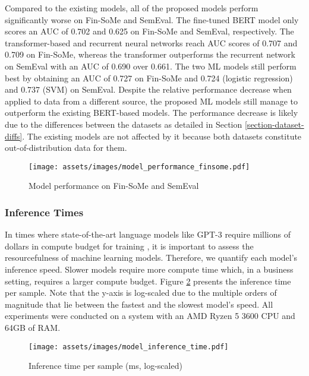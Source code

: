 Compared to the existing models, all of the proposed models perform significantly worse on Fin-SoMe and SemEval. The fine-tuned BERT model only scores an AUC of 0.702 and 0.625 on Fin-SoMe and SemEval, respectively. The transformer-based and recurrent neural networks reach AUC scores of 0.707 and 0.709 on Fin-SoMe, whereas the transformer outperforms the recurrent network on SemEval with an AUC of 0.690 over 0.661. The two ML models still perform best by obtaining an AUC of 0.727 on Fin-SoMe and 0.724 (logistic regression) and 0.737 (SVM) on SemEval. Despite the relative performance decrease when applied to data from a different source, the proposed ML models still manage to outperform the existing BERT-based models. The performance decrease is likely due to the differences between the datasets as detailed in Section \ref{section-dataset-diffs}. The existing models are not affected by it because both datasets constitute out-of-distribution data for them.

\begin{figure}[!ht]
	\texttt{[image: assets/images/model\_performance\_finsome.pdf]}	
	\caption{Model performance on Fin-SoMe and SemEval}
	\label{figure-model-performance-stocktwits}
\end{figure}



\subsubsection{Inference Times}
In times where state-of-the-art language models like GPT-3 require millions of dollars in compute budget for training \cite{gpt3-cost}, it is important to assess the resourcefulness of machine learning models. Therefore, we quantify each model's inference speed. Slower models require more compute time which, in a business setting, requires a larger compute budget. Figure \ref{figure-model-inference-times} presents the inference time per sample. Note that the y-axis is log-scaled due to the multiple orders of magnitude that lie between the fastest and the slowest model's speed. All experiments were conducted on a system with an AMD Ryzen 5 3600 CPU and 64GB of RAM.

\begin{figure}[!ht]
	\texttt{[image: assets/images/model\_inference\_time.pdf]}	
	\caption{Inference time per sample (ms, log-scaled)}
	\label{figure-model-inference-times}
\end{figure}

